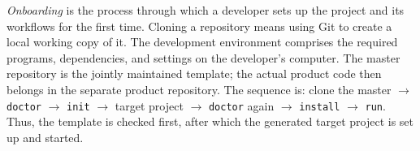 \begin{beginnerstatement}

\emph{Onboarding} is the process through which a developer sets up the project
and its workflows for the first time. Cloning a repository means using Git to
create a local working copy of it. The development environment comprises the
required programs, dependencies, and settings on the developer's computer.
The master repository is the jointly maintained template; the actual product
code then belongs in the separate product repository. The sequence is: clone
the master \(\rightarrow\) \texttt{doctor} \(\rightarrow\) \texttt{init}
\(\rightarrow\) target project \(\rightarrow\) \texttt{doctor} again
\(\rightarrow\) \texttt{install} \(\rightarrow\) \texttt{run}. Thus, the
template is checked first, after which the generated target project is set up
and started.

\end{beginnerstatement}

